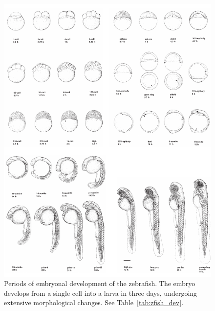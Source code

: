 \begin{figure}
 \centering
 \includegraphics{Chapters/tweezers/Figs/PDF/zebrafish_stages}
 \caption[Periods of embryonal development of the \gls{zebrafish}]{
Periods of embryonal development of the \gls{zebrafish}.
The embryo develops from a single cell into a larva in three days, undergoing extensive morphological changes.
See Table~\ref{tab:zfish_dev}.
 }\label{fig:zebrafish_stages}
\end{figure}

